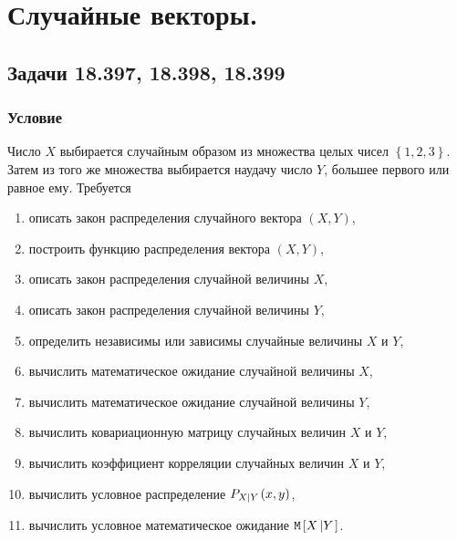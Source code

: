 \chapter{Случайные векторы.}


\section{Задачи 18.397, 18.398, 18.399}
\subsection*{Условие}
Число $X$ выбирается случайным образом из множества целых чисел $\left \{ 1, 2, 3 \right \}$. Затем из того же множества выбирается наудачу число $Y$, большее первого
или равное ему. Требуется
\begin{enumerate}
    \item описать закон распределения случайного вектора $\left ( X, Y \right )$,
    \item построить функцию распределения вектора $(X, Y)$,
    \item описать закон распределения случайной величины $X$,
    \item описать закон распределения случайной величины $Y$,
    \item определить независимы или зависимы случайные величины $X$ и $Y$,
    \item вычислить математическое ожидание случайной величины $X$,
    \item вычислить математическое ожидание случайной величины $Y$,
    \item вычислить ковариационную матрицу случайных величин $X$ и $Y$,
    \item вычислить коэффициент корреляции случайных величин $X$ и $Y$,
    \item вычислить условное распределение $P_{X \left | Y \right .}(x,y)$,
    \item вычислить условное математическое ожидание $\mathtt{M} \left [ X \left | Y \right . \right ]$.
\end{enumerate}

